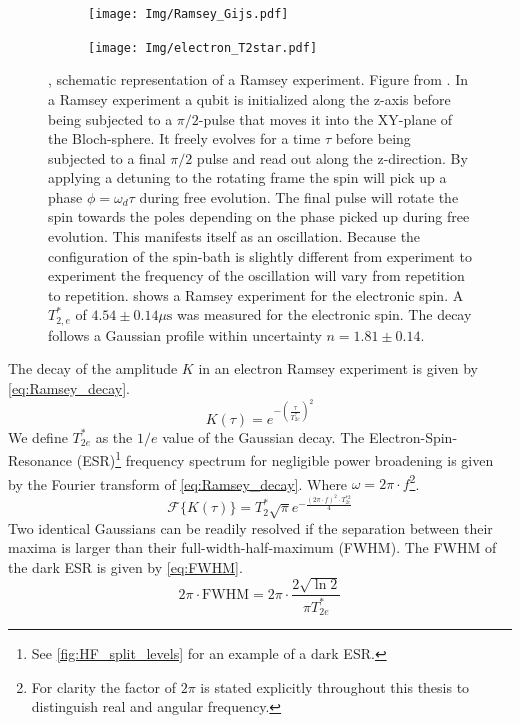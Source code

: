 \begin{figure}[htbp]
    \centering
    \begin{subfigure}[t]{0.49\textwidth}\centering
        \caption{}
        \texttt{[image: Img/Ramsey\_Gijs.pdf]}
        \label{fig:Ramsey_gijs}
    \end{subfigure}
    \begin{subfigure}[t]{0.49\textwidth}\centering
        \caption{}
        \texttt{[image: Img/electron\_T2star.pdf]}
        \label{fig:electron_T2*}
    \end{subfigure}
        \caption{
        , schematic representation of a Ramsey experiment. Figure from \citet{Lange2012Quantum}.
        In a Ramsey experiment a qubit is initialized along the z-axis before being subjected to a $\pi/2$-pulse that moves it into the XY-plane of the Bloch-sphere.
        It freely evolves for a time $\tau$ before being subjected to a final $\pi/2$ pulse and read out along the z-direction.
        By applying a detuning to the rotating frame the spin will pick up a phase $\phi = \omega_d \tau$ during free evolution.
        The final pulse will rotate the spin towards the poles depending on the phase picked up during free evolution.
        This manifests itself as an oscillation.
        Because the configuration of the spin-bath is slightly different from experiment to experiment the frequency of the oscillation will vary from repetition to repetition.
         shows a Ramsey experiment for the electronic spin.
        A $T_{2,e}^*$ of $4.54 \pm 0.14 \mu\mathrm{s}$ was measured for the electronic spin. The decay follows a Gaussian profile within uncertainty $n = 1.81 \pm 0.14$. }
\end{figure}

The decay of the amplitude $K$ in an electron Ramsey experiment is given by \cref{eq:Ramsey_decay}.
\begin{equation}
    K(\tau) = e^{-(\tfrac{\tau}{T_{2e}^*})^2}
    \label{eq:Ramsey_decay}
\end{equation}
We define $T_{2e}^*$ as the $1/e$ value of the Gaussian decay. The Electron-Spin-Resonance (ESR)\footnote{See \cref{fig:HF_split_levels} for an example of a dark ESR.} frequency spectrum for negligible power broadening is given by the Fourier transform of \cref{eq:Ramsey_decay}. Where $\omega = 2\pi \cdot f$\footnote{For clarity the factor of $2\pi$ is stated explicitly throughout this thesis to distinguish real and angular frequency. }.
\begin{equation}
    \mathcal{F} \{ K(\tau) \} =  T_2^* \sqrt{\pi} e^{-\tfrac{(2\pi \cdot f) ^2 \cdot T_{2e}^{*2}}{ 4}}
\end{equation}
Two identical Gaussians can be readily resolved if the separation between their maxima is larger than their full-width-half-maximum (FWHM).
The FWHM of the dark ESR is given by \cref{eq:FWHM}.
\begin{equation}
    2\pi \cdot \mathrm{FWHM} = 2\pi \cdot \frac{2\sqrt{\ln{2}}}{\pi T_{2e}^*}
    \label{eq:FWHM}
\end{equation}

